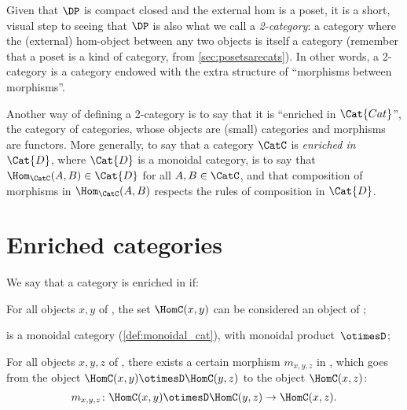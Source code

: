 Given that $\DP$ is compact closed and the external hom is a poset, it is a short, visual step to seeing that $\DP$ is also what we call a \emph{2-category}: a category where the (external) hom-object between any two objects is itself a category (remember that a poset is a kind of category, from \cref{sec:posetsarecats}). In other words, a 2-category is a category endowed with the extra structure of ``morphisms between morphisms''.

Another way of defining a 2-category is to say that it is ``enriched in $\Cat{Cat}$'', the category of categories, whose objects are (small) categories and morphisms are functors. More generally, to say that a category $\CatC$ is \emph{enriched in $\Cat{D}$}, where $\Cat{D}$ is a monoidal category, is to say that $\Hom_\CatC(A,B) \in \Cat{D}$ for all $A,B \in \CatC$, and that composition of morphisms in $\Hom_\CatC(A,B)$ respects the rules of composition in $\Cat{D}$.

\section{Enriched categories}

\begin{ctdefinition}
We say that a category \CatC is enriched in \CatD if:
\begin{compactenum}
    \item For all objects $x, y$ of \CatC, the set $\HomC(x,y)$ can be considered an object of \CatD;
    \item \CatD is a monoidal category (\cref{def:monoidal_cat}),
    with monoidal product~$\otimesD$;
    \item For all objects $x, y, z$ of \CatC, there exists
    a certain morphism $m_{x,y,z}$ in \CatD,
    which goes from the object $\HomC(x, y) \otimesD \HomC(y, z)$ to the object $\HomC(x, z)$:
    \begin{equation} \label{eq:enriched-condition}
        m_{x,y,z} \colon \HomC(x, y) \otimesD \HomC(y, z) \to \HomC(x, z) .
    \end{equation}
\end{compactenum}
\end{ctdefinition}

%

